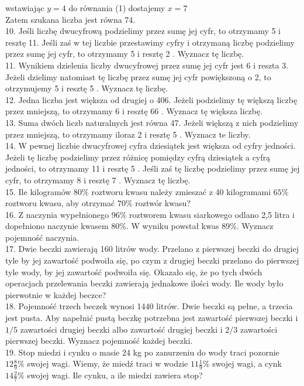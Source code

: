 \documentclass[10pt]{article}
\begin{document}
wstawiając \(y=4\) do równania (1) dostajemy \(x=7\)\\
Zatem szukana liczba jest równa 74.\\
10. Jeśli liczbę dwucyfrową podzielimy przez sumę jej cyfr, to otrzymamy 5 i resztę 11. Jeśli zaś w tej liczbie przestawimy cyfry i otrzymaną liczbę podzielimy przez sumę jej cyfr, to otrzymamy 5 i resztę 2 . Wyznacz tę liczbę.\\
11. Wynikiem dzielenia liczby dwucyfrowej przez sumę jej cyfr jest 6 i reszta 3. Jeżeli dzielimy natomiast tę liczbę przez sumę jej cyfr powiększoną o 2, to otrzymujemy 5 i resztę 5 . Wyznacz tę liczbę.\\
12. Jedna liczba jest większa od drugiej o 406. Jeżeli podzielimy tę większą liczbę przez mniejszą, to otrzymamy 6 i resztę 66 . Wyznacz tę większa liczbę.\\
13. Suma dwóch liczb naturalnych jest równa 47. Jeżeli większą z nich podzielimy przez mniejszą, to otrzymamy iloraz 2 i resztę 5 . Wyznacz te liczby.\\
14. W pewnej liczbie dwucyfrowej cyfra dziesiątek jest większa od cyfry jedności. Jeżeli tę liczbę podzielimy przez różnicę pomiędzy cyfrą dziesiątek a cyfrą jedności, to otrzymamy 11 i resztę 5 . Jeśli zaś tę liczbę podzielimy przez sumę jej cyfr, to otrzymamy 8 i resztę 7 . Wyznacz tę liczbę.\\
15. Ile kilogramów \(80 \%\) roztworu kwasu należy zmieszać z 40 kilogramami \(65 \%\) roztworu kwasu, aby otrzymać \(70 \%\) roztwór kwasu?\\
16. Z naczynia wypełnionego \(96 \%\) roztworem kwasu siarkowego odlano 2,5 litra i dopełniono naczynie kwasem \(80 \%\). W wyniku powstał kwas \(89 \%\). Wyznacz pojemność naczynia.\\
17. Dwie beczki zawierają 160 litrów wody. Przelano z pierwszej beczki do drugiej tyle by jej zawartość podwoiła się, po czym z drugiej beczki przelano do pierwszej tyle wody, by jej zawartość podwoiła się. Okazało się, że po tych dwóch operacjach przelewania beczki zawierają jednakowe ilości wody. Ile wody było pierwotnie w każdej beczce?\\
18. Pojemność trzech beczek wynosi 1440 litrów. Dwie beczki są pełne, a trzecia jest pusta. Aby napełnić pustą beczkę potrzebna jest zawartość pierwszej beczki i \(1 / 5\) zawartości drugiej beczki albo zawartość drugiej beczki i \(2 / 3\) zawartości pierwszej beczki. Wyznacz pojemność każdej beczki.\\
19. Stop miedzi i cynku o masie 24 kg po zanurzeniu do wody traci pozornie \(12 \frac{8}{9} \%\) swojej wagi. Wiemy, że miedź traci w wodzie \(11 \frac{1}{9} \%\) swojej wagi, a cynk \(14 \frac{2}{7} \%\) swojej wagi. Ile cynku, a ile miedzi zawiera stop?\\
\end{document}
